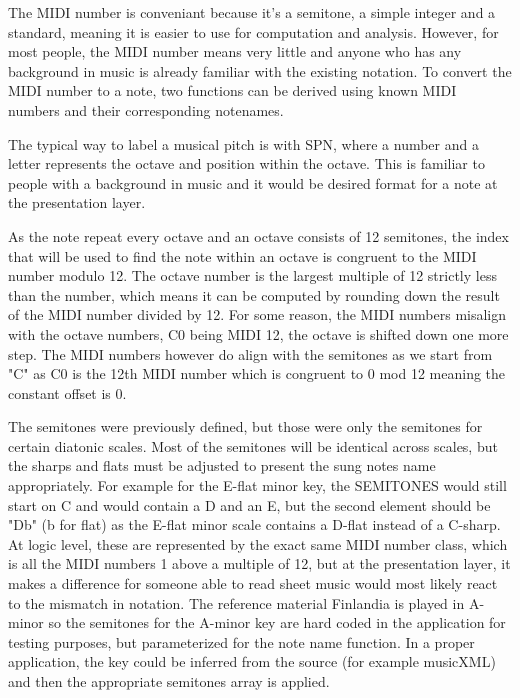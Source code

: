 The MIDI number is conveniant because it's a semitone, a simple integer and a standard, meaning it is easier to use for computation and analysis. However, for most people, the MIDI number means very little and anyone who has any background in music is already familiar with the existing notation. To convert the MIDI number to a note, two functions can be derived using known MIDI numbers and their corresponding notenames. 

The typical way to label a musical pitch is with SPN, where a number and a letter represents the octave and position within the octave. This is familiar to people with a background in music and it would be desired format for a note at the presentation layer.

As the note repeat every octave and an octave consists of 12 semitones, the index that will be used to find the note within an octave is congruent to the MIDI number modulo 12. The octave number is the largest multiple of 12 strictly less than the number, which means it can be computed by rounding down the result of the MIDI number divided by 12. For some reason, the MIDI numbers misalign with the octave numbers, C0 being MIDI 12, the octave is shifted down one more step. The MIDI numbers however do align with the semitones as we start from "C" as C0 is the 12th MIDI number which is congruent to 0 mod 12 meaning the constant offset is 0.


The semitones were previously defined, but those were only the semitones for certain diatonic scales. Most of the semitones will be identical across scales, but the sharps and flats must be adjusted to present the sung notes name appropriately. For example for the E-flat minor key, the SEMITONES would still start on C and would contain a D and an E, but the second element should be "Db" (b for flat) as the E-flat minor scale contains a D-flat instead of a C-sharp. At logic level, these are represented by the exact same MIDI number class, which is all the MIDI numbers 1 above a multiple of 12, but at the presentation layer, it makes a difference for someone able to read sheet music would most likely react to the mismatch in notation. The reference material Finlandia is played in A-minor so the semitones for the A-minor key are hard coded in the application for testing purposes, but parameterized for the note name function. In a proper application, the key could be inferred from the source (for example musicXML) and then the appropriate semitones array is applied.

